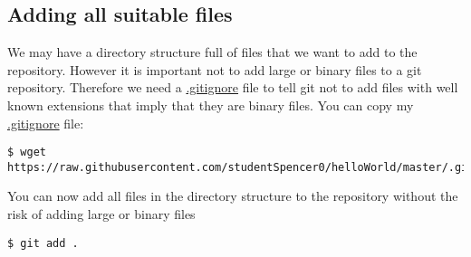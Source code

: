 \subsection{Adding all suitable files}

We may have a directory structure full of files that we want to add
to the repository. However it is important not to add large or binary
files to a git repository. Therefore we need a \url{.gitignore} file
to tell git not to add files with well known extensions that imply
that they are binary files. You can copy my \url{.gitignore} file:

\begin{lstlisting}[basicstyle=\scriptsize]
$ wget https://raw.githubusercontent.com/studentSpencer0/helloWorld/master/.gitignore
\end{lstlisting}

You can now add all files in the directory structure to the repository
without the risk of adding large or binary files
\begin{lstlisting}
$ git add .
\end{lstlisting}
\clearpage{}



